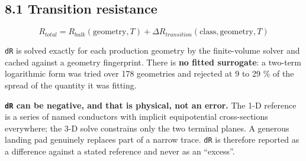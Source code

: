 \documentclass[10pt,]{article}
\begin{document}
\hypertarget{transition-resistance}{%
\subsection{8.1 Transition resistance}\label{transition-resistance}}

\[R_{total} = R_{bulk}(\text{geometry}, T) + \Delta R_{transition}(\text{class}, \text{geometry}, T)\]

\texttt{dR} is solved exactly for each production geometry by the
finite-volume solver and cached against a geometry fingerprint. There is
\textbf{no fitted surrogate}: a two-term logarithmic form was tried over
178 geometries and rejected at 9 to 29 \% of the spread of the quantity
it was fitting.

\textbf{\texttt{dR} can be negative, and that is physical, not an
error.} The 1-D reference is a series of named conductors with implicit
equipotential cross-sections everywhere; the 3-D solve constrains only
the two terminal planes. A generous landing pad genuinely replaces part
of a narrow trace. \texttt{dR} is therefore reported as a difference
against a stated reference and never as an ``excess''.
\end{document}
